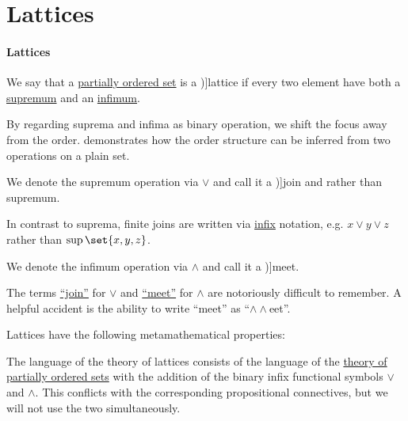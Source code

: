 \section{Lattices}\label{sec:lattices}

\paragraph{Lattices}

\begin{definition}\label{def:lattice}
  We say that a \hyperref[def:partially_ordered_set]{partially ordered set} is a \term[ru=решётка (\cite[def. 1.2]{КравченкоШвидефски2019ОбщаяАлгебра})]{lattice} if every two element have both a \hyperref[def:extremal_points/supremum_and_infimum]{supremum} and an \hyperref[def:extremal_points/supremum_and_infimum]{infimum}.

  By regarding suprema and infima as binary operation, we shift the focus away from the order.  demonstrates how the order structure can be inferred from two operations on a plain set.

  \begin{thmenum}[series=def:lattice]
     We denote the supremum operation via \( \vee \) and call it a \term[ru=объединение (\cite[def. 4.2]{Гуров2013Решётки})]{join} and rather than supremum.

    In contrast to suprema, finite joins are written via \hyperref[rem:first_order_formula_conventions/infix]{infix} notation, e.g. \( x \vee y \vee z \) rather than \( \sup\set{ x, y, z } \).

     We denote the infimum operation via \( \wedge \) and call it a \term[ru=сечение (\cite[def. 4.2]{Гуров2013Решётки})]{meet}.
  \end{thmenum}

  The terms \hyperref[def:lattice/join]{\enquote{join}} for \( \vee \) and \hyperref[def:lattice/meet]{\enquote{meet}} for \( \wedge \) are notoriously difficult to remember. A helpful accident is the ability to write \enquote{meet} as \enquote{\( \wedge \wedge \)eet}.

  Lattices have the following metamathematical properties:
  \begin{thmenum}[resume=def:lattice]
    \mimprovised The language of the theory of lattices consists of the language of the \hyperref[def:partially_ordered_set]{theory of partially ordered sets} with the addition of the binary infix functional symbols \( \vee \) and \( \wedge \). This conflicts with the corresponding propositional connectives, but we will not use the two simultaneously.


\end{thmenum}
\end{definition}
